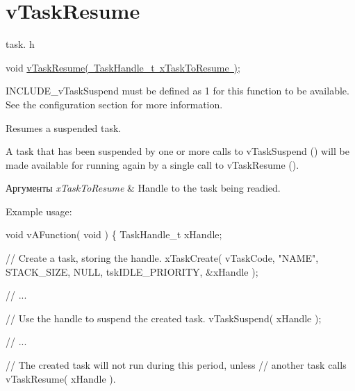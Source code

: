 \hypertarget{group__v_task_resume}{}\section{v\+Task\+Resume}
\label{group__v_task_resume}
task. h 
\begin{DoxyPre}void \mbox{\hyperlink{task_8h_a84a1584f29fb7736a1aa72ad5b3e9b44}{vTaskResume( TaskHandle\_t xTaskToResume )}};\end{DoxyPre}


I\+N\+C\+L\+U\+D\+E\+\_\+v\+Task\+Suspend must be defined as 1 for this function to be available. See the configuration section for more information.

Resumes a suspended task.

A task that has been suspended by one or more calls to v\+Task\+Suspend () will be made available for running again by a single call to v\+Task\+Resume ().


\begin{DoxyParams}{Аргументы}
{\em x\+Task\+To\+Resume} & Handle to the task being readied.\\
\hline
\end{DoxyParams}
Example usage\+: 
\begin{DoxyPre}
void vAFunction( void )
\{
TaskHandle\_t xHandle;\end{DoxyPre}



\begin{DoxyPre}    // Create a task, storing the handle.
    xTaskCreate( vTaskCode, "NAME", STACK\_SIZE, NULL, tskIDLE\_PRIORITY, \&xHandle );\end{DoxyPre}



\begin{DoxyPre}    // ...\end{DoxyPre}



\begin{DoxyPre}    // Use the handle to suspend the created task.
    vTaskSuspend( xHandle );\end{DoxyPre}



\begin{DoxyPre}    // ...\end{DoxyPre}



\begin{DoxyPre}    // The created task will not run during this period, unless
    // another task calls vTaskResume( xHandle ).\end{DoxyPre}



